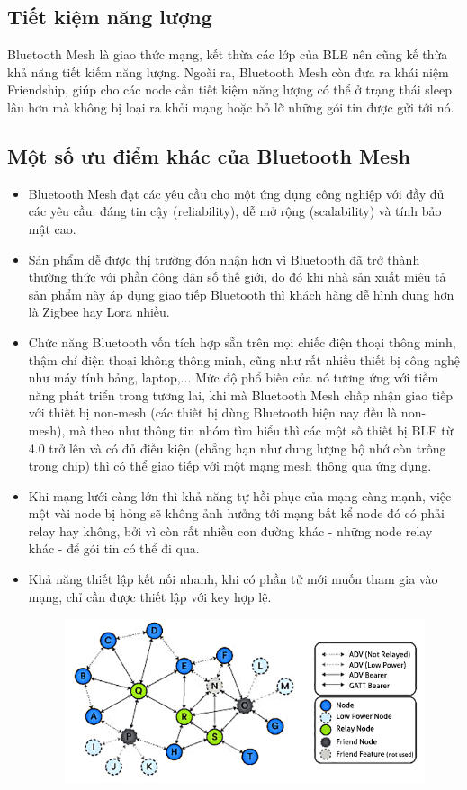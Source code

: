         \subsection{Tiết kiệm năng lượng}
        Bluetooth Mesh là giao thức mạng, kết thừa các lớp của BLE nên cũng kế thừa khả năng tiết kiếm năng lượng. Ngoài ra, Bluetooth Mesh còn đưa ra khái niệm Friendship, giúp cho các node cần tiết kiệm năng lượng  có thể ở trạng thái sleep lâu hơn mà không bị loại ra khỏi mạng hoặc bỏ lỡ những gói tin được gửi tới nó. 
        \subsection{Một số ưu điểm khác của Bluetooth Mesh}
        \begin{itemize}
            \item Bluetooth Mesh đạt các yêu cầu cho một ứng dụng công nghiệp với đầy đủ các yêu cầu: đáng tin cậy (reliability), dễ mở rộng (scalability) và tính bảo mật cao.
            \item Sản phẩm dễ được thị trường đón nhận hơn vì Bluetooth đã trở thành thường thức với phần đông dân số thế giới, do đó khi nhà sản xuất miêu tả sản phẩm này áp dụng giao tiếp Bluetooth thì khách hàng dễ hình dung hơn là Zigbee hay Lora nhiều.
            \item Chức năng Bluetooth vốn tích hợp sẵn trên mọi chiếc điện thoại thông minh, thậm chí điện thoại không thông minh, cũng như rất nhiều thiết bị công nghệ như máy tính bảng, laptop,... Mức độ phổ biến của nó tương ứng với tiềm năng phát triển trong tương lai, khi mà Bluetooth Mesh chấp nhận giao tiếp với thiết bị non-mesh (các thiết bị dùng Bluetooth hiện nay đều là non-mesh), mà theo như thông tin nhóm tìm hiểu thì các một số thiết bị BLE từ 4.0 trở lên và có đủ điều kiện (chẳng hạn như dung lượng bộ nhớ còn trống trong chip) thì có thể giao tiếp với một mạng mesh thông qua ứng dụng.
            \item Khi mạng lưới càng lớn thì khả năng tự hồi phục của mạng càng mạnh, việc một vài node bị hỏng sẽ không ảnh hưởng tới mạng bất kể node đó có phải relay hay không, bởi vì còn rất nhiều con đường khác - những node relay khác - để gói tin có thể đi qua.
            \item Khả năng thiết lập kết nối nhanh, khi có phần tử mới muốn tham gia vào mạng, chỉ cần được thiết lập với key hợp lệ.
            \begin{figure}[h!]
        	    \begin{center}
        		    \includegraphics[scale=1.0]{images/mesh-topo.jpg}

\end{center}
\end{figure}
\end{itemize}
